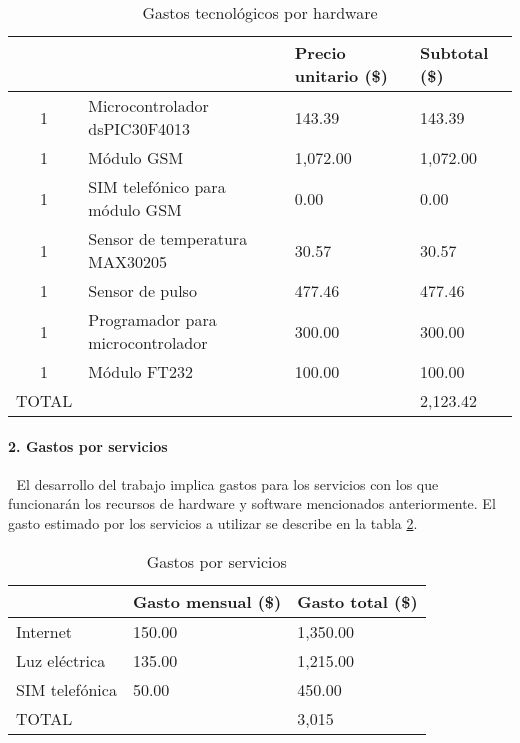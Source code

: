\begin{table}[htbp]
	\begin{center}
		\begin{tabular}{|c|p{4cm}|p{3cm}|p{3cm}|}
			\hline
			\thead{Cantidad}&\thead{Recurso}&\thead{Precio unitario\\(\$)}&\thead{Subtotal\\(\$)} \\
			\hline
			\hline
			1 &Microcontrolador dsPIC30F4013&143.39&143.39\\
			\hline
			1 & Módulo GSM&1,072.00&1,072.00 \\
			\hline
			1 &SIM telefónico para módulo GSM&0.00&0.00\\
			\hline
			1 &Sensor de temperatura MAX30205&30.57&30.57\\
			\hline
			1 &Sensor de pulso&477.46&477.46\\
			\hline
			1 &Programador para microcontrolador&300.00&300.00\\
			\hline
			1 &Módulo FT232&100.00&100.00\\
			\hline
			\hline
			TOTAL & &&2,123.42\\
			\hline
		\end{tabular}
		\caption{Gastos tecnológicos por hardware}
		\label{disenoEstructura:gastosHardware}
	\end{center}
\end{table}


\paragraph{2. Gastos por servicios} \textcolor{White}{.} \newline
El desarrollo del trabajo implica gastos para los servicios con los que funcionarán los recursos de hardware y software mencionados anteriormente. El gasto estimado por los servicios a utilizar se describe en la tabla \ref{disenoEstructura:gastosServicios}.\\


\begin{table}[htbp]
	\begin{center}
		\begin{tabular}{|p{4cm}|p{3cm}|p{3cm}|}
			\hline
			\thead{Servicio}&\thead{Gasto mensual\\(\$)}&\thead{Gasto total\\(\$)}\\
			\hline
			\hline
			Internet &150.00 &1,350.00 \\
			\hline
			Luz eléctrica &135.00 &1,215.00 \\
			\hline
			SIM telefónica &50.00 &450.00\\
			\hline
			\hline
			TOTAL & &3,015\\
			\hline
		\end{tabular}
		\caption{Gastos por servicios}
		\label{disenoEstructura:gastosServicios}
	\end{center}
\end{table}

